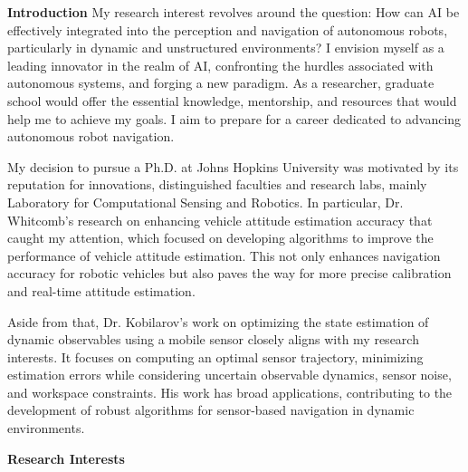 \documentclass[a4,20pt]{article}
\begin{document}
\begin{large} 

\textbf{Introduction} \newline
My research interest revolves around the question: How can AI be effectively integrated into the perception and navigation of autonomous robots, particularly in dynamic and unstructured environments? I envision myself as a leading innovator in the realm of AI, confronting the hurdles associated with autonomous systems, and forging a new paradigm. As a researcher, graduate school would offer the essential knowledge, mentorship, and resources that would help me to achieve my goals. I aim to prepare for a career dedicated to advancing autonomous robot navigation.   \vspace{-0.35cm}

My decision to pursue a Ph.D. at Johns Hopkins University was motivated by its reputation for innovations, distinguished faculties and research labs, mainly Laboratory for Computational Sensing and Robotics. In particular, Dr. Whitcomb's research on enhancing vehicle attitude estimation accuracy that caught my attention, which focused on developing algorithms to improve the performance of vehicle attitude estimation. This not only enhances navigation accuracy for robotic vehicles but also paves the way for more precise calibration and real-time attitude estimation.  \vspace{-0.35cm}

Aside from that, Dr. Kobilarov's work on optimizing the state estimation of dynamic observables using a mobile sensor closely aligns with my research interests. It focuses on computing an optimal sensor trajectory, minimizing estimation errors while considering uncertain observable dynamics, sensor noise, and workspace constraints. His work has broad applications, contributing to the development of robust algorithms for sensor-based navigation in dynamic environments.  \vspace{-0.25cm}


\textbf{Research Interests} \vspace{-0.35cm}


\end{large}
\end{document}
